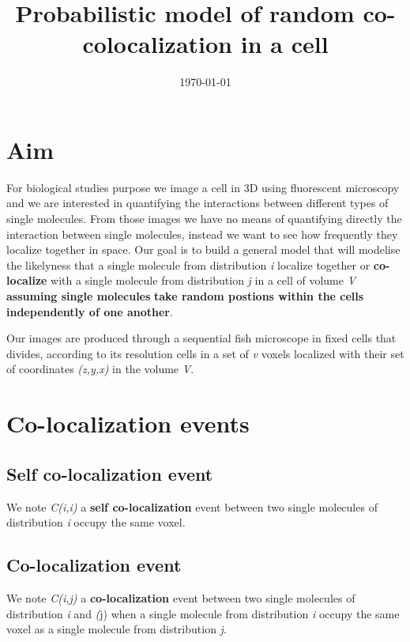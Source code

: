 \documentclass{article}
\title{Probabilistic model of random co-colocalization in a cell}
\author{}
\date{\today}
\begin{document}
\maketitle






\section{Aim}
For biological studies purpose we image a cell in 3D using fluorescent microscopy and we are interested in quantifying the 
interactions between different types of single molecules. From those images we have no means of quantifying directly the interaction
between single molecules, instead we want to see how frequently they localize together in space. Our goal is to build a general model
that will modelise the likelyness that a single molecule from distribution \textit{i} localize together or \textbf{co-localize} with
a single molecule from distribution \textit{j} in a cell of volume \textit{V} \textbf{assuming single molecules} 
\textbf{take random postions within the cells independently of one another}.

Our images are produced through a sequential fish microscope in fixed cells that divides, according to its resolution cells in a set of
\textit{v} voxels localized with their set of coordinates \textit{(z,y,x)} in the volume \textit{V}. 












\section{Co-localization events}
\subsection{Self co-localization event}
We note \textit{C(i,i)} a \textbf{self co-localization} event between two single molecules of distribution \textit{i} occupy the same
voxel.

\subsection{Co-localization event}
We note \textit{C(i,j)} a \textbf{co-localization} event between two single molecules of distribution \textit{i} and \textit(j)
when a single molecule from distribution \textit{i} occupy the same voxel as a single molecule from distribution \textit{j}.
\end{document}
